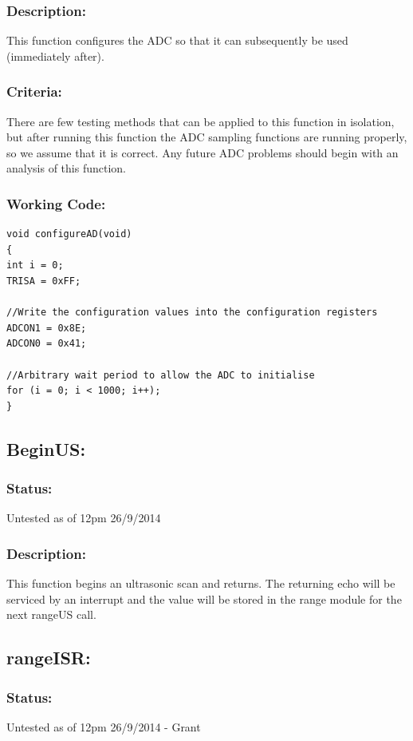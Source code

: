\documentclass[]{report}
\begin{document}
\subsubsection{Description:}
This function configures the ADC so that it can subsequently be used (immediately after).

\subsubsection{Criteria:}
There are few testing methods that can be applied to this function in isolation, but after running this function the ADC sampling functions are running properly, so we assume that it is correct. Any future ADC problems should begin with an analysis of this function.

\subsubsection{Working Code:}
\begin{lstlisting}
void configureAD(void)
{
int i = 0;
TRISA = 0xFF;

//Write the configuration values into the configuration registers
ADCON1 = 0x8E;
ADCON0 = 0x41;

//Arbitrary wait period to allow the ADC to initialise
for (i = 0; i < 1000; i++);
}
\end{lstlisting}

\subsection{BeginUS:}
\subsubsection{Status:}
Untested as of 12pm 26/9/2014

\subsubsection{Description:}
This function begins an ultrasonic scan and returns. The returning echo will be serviced by an interrupt and the value will be stored in the range module for the next rangeUS call.

\subsection{rangeISR:}
\subsubsection{Status:}
Untested as of 12pm 26/9/2014 - Grant
\end{document}
